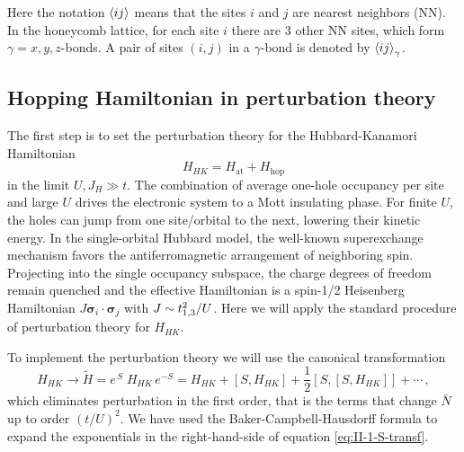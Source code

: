 Here the notation $\braket{ij}$ means that the sites $i$ and $j$ are nearest neighbors (NN).  In the honeycomb lattice, for each site $i$ there are $3$ other NN sites, which form $\gamma= x, y, z$-bonds. A pair of sites $(i,j)$ in a $\gamma$-bond is denoted by $\braket{ij}_\gamma$.


\subsection{Hopping Hamiltonian in perturbation theory}\label{sec:3.2}

The first step is to set the perturbation theory for the Hubbard-Kanamori Hamiltonian
\begin{equation}
    H_{HK} = H_{\mathrm{at}}+H_\text{hop}
\end{equation}
in the limit $U,J_H\gg t$. The combination of average one-hole occupancy per site and large $U$ drives the electronic system to a Mott insulating phase. For finite $U$, the holes can jump from one site/orbital to the next, lowering their kinetic energy. %
In the single-orbital Hubbard model, the well-known superexchange mechanism  favors the antiferromagnetic arrangement of neighboring spin. Projecting into the single occupancy subspace, the charge degrees of freedom remain quenched and the effective Hamiltonian is a spin-1/2 Heisenberg Hamiltonian  $J \bm{\sigma}_i\cdot\bm{\sigma}_j$ with $J\sim t_{\scriptsize 1,3}^2/U$. Here we will apply the standard procedure of perturbation theory for $H_{HK}$.



To implement the perturbation theory we will use the canonical transformation
\begin{equation}
    H_{HK} \to \tilde{H} = e^{\, S}  \;  H_{HK} \, e^{-S} = H_{HK} + [S,H_{HK}]+\frac{1}{2}[S,[S,H_{HK}]] + \cdots \, , \label{eq:II-1-S-transf}
\end{equation}
which eliminates perturbation in the first order, that is the terms that change $\bar{N}$ up to order $(t/U)^2$. We have used the Baker-Campbell-Hausdorff formula to expand the exponentials in the right-hand-side of equation \eqref{eq:II-1-S-transf}.

